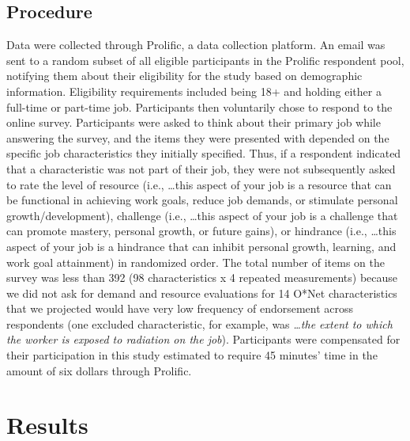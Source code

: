 \documentclass[
  english,
  man]{apa6}
\begin{document}
\hypertarget{procedure}{%
\subsection{Procedure}\label{procedure}}

Data were collected through Prolific, a data collection platform. An email was sent to a random subset of all eligible participants in the Prolific respondent pool, notifying them about their eligibility for the study based on demographic information. Eligibility requirements included being 18+ and holding either a full-time or part-time job. Participants then voluntarily chose to respond to the online survey. Participants were asked to think about their primary job while answering the survey, and the items they were presented with depended on the specific job characteristics they initially specified. Thus, if a respondent indicated that a characteristic was not part of their job, they were not subsequently asked to rate the level of resource (i.e., \ldots this aspect of your job is a resource that can be functional in achieving work goals, reduce job demands, or stimulate personal growth/development), challenge (i.e., \ldots this aspect of your job is a challenge that can promote mastery, personal growth, or future gains), or hindrance (i.e., \ldots this aspect of your job is a hindrance that can inhibit personal growth, learning, and work goal attainment) in randomized order. The total number of items on the survey was less than 392 (98 characteristics x 4 repeated measurements) because we did not ask for demand and resource evaluations for 14 O*Net characteristics that we projected would have very low frequency of endorsement across respondents (one excluded characteristic, for example, was \emph{\ldots the extent to which the worker is exposed to radiation on the job}). Participants were compensated for their participation in this study estimated to require 45 minutes' time in the amount of six dollars through Prolific.

\hypertarget{results}{%
\section{Results}\label{results}}
\end{document}
